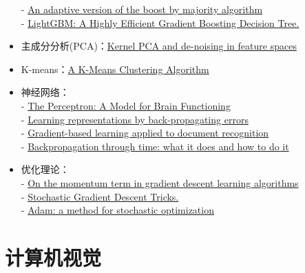 \documentclass[lang=cn,11pt,a4paper]{elegant_template}
\begin{document}
\begin{itemize}
    - \href{https://cseweb.ucsd.edu/~yfreund/papers/brownboost.pdf}{An adaptive version of the boost by majority algorithm} \\
    - \href{https://papers.nips.cc/paper/2017/file/6449f44a102fde848669bdd9eb6b76fa-Paper.pdf}{LightGBM: A Highly Efficient Gradient Boosting Decision Tree.} 
    \item 主成分分析(PCA)：\href{https://alex.smola.org/papers/1999/MikSchSmoMuletal99.pdf}{Kernel PCA and de-noising in feature spaces}	
    \item K-means：\href{https://www.jstor.org/stable/2346830?seq=1}{A K-Means Clustering Algorithm}
    \item 神经网络：\\
    - \href{https://static1.squarespace.com/static/5b58c02775f9ee8fa7e52f00/t/5eff679acdfa560968e5f7f2/1593796507323/block_62.pdf}{The Perceptron: A Model for Brain Functioning}\\
    - \href{https://www.nature.com/articles/323533a0}{Learning representations by back-propagating errors}	\\
    - \href{http://vision.stanford.edu/cs598_spring07/papers/Lecun98.pdf}{Gradient-based learning applied to document recognition} \\
    - \href{https://ieeexplore.ieee.org/document/58337}{Backpropagation through time: what it does and how to do it} 
    \item 优化理论：\\
    - \href{https://citeseerx.ist.psu.edu/viewdoc/download?doi=10.1.1.57.5612&rep=rep1&type=pdf}{On the momentum term in gradient descent learning algorithms} \\
    - \href{https://www.microsoft.com/en-us/research/publication/stochastic-gradient-tricks/}{Stochastic Gradient Descent Tricks.}	\\
    - \href{https://arxiv.org/abs/1412.6980}{Adam: a method for stochastic optimization}
\end{itemize}

\section{计算机视觉}
\end{document}
